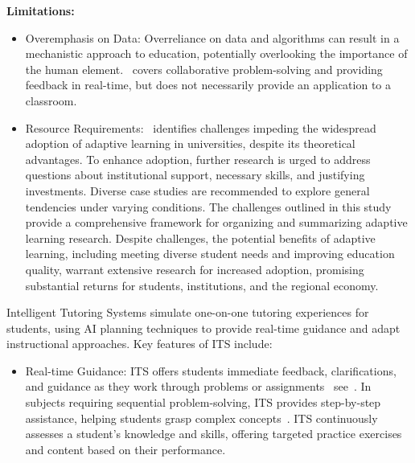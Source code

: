 \textbf{Limitations:}
\begin{itemize}
    \item Overemphasis on Data: Overreliance on data and algorithms can result in a mechanistic approach to education, potentially overlooking the importance of the human element.~\citet{Rojas2022} covers collaborative problem-solving and providing feedback in real-time, but does not necessarily provide an application to a classroom.
    
    \item Resource Requirements:~\citet{Mirata2020} identifies challenges impeding the widespread adoption of adaptive learning in universities, despite its theoretical advantages. To enhance adoption, further research is urged to address questions about institutional support, necessary skills, and justifying investments. Diverse case studies are recommended to explore general tendencies under varying conditions. The challenges outlined in this study provide a comprehensive framework for organizing and summarizing adaptive learning research. Despite challenges, the potential benefits of adaptive learning, including meeting diverse student needs and improving education quality, warrant extensive research for increased adoption, promising substantial returns for students, institutions, and the regional economy.
\end{itemize}

Intelligent Tutoring Systems simulate one-on-one tutoring experiences for students, using AI planning techniques to provide real-time guidance and adapt instructional approaches. Key features of ITS include:

\begin{itemize}
    \item Real-time Guidance: ITS offers students immediate feedback, clarifications, and guidance as they work through problems or assignments \textemdash~see~\citet{Corbett1997}. In subjects requiring sequential problem-solving, ITS provides step-by-step assistance, helping students grasp complex concepts~\cite{burns2013intelligent}. ITS continuously assesses a student's knowledge and skills, offering targeted practice exercises and content based on their performance.
\end{itemize}

